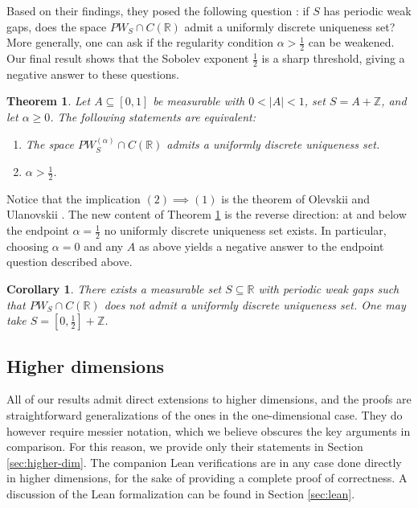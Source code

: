 \documentclass[reqno,a4paper,12pt]{amsart}
\numberwithin{equation}{section}
\newtheorem{theorem}[definition]{Theorem}
\newtheorem{corollary}[definition]{Corollary}
\def\Z{{\mathbb Z}}
\def\R{{\mathbb R}}
\newcommand\1{\mathds{1}}
\begin{document}
Based on their findings, they posed the following question \cite[Section 7.2]{OlevskiiUlanovskii2017}: if $S$ has periodic weak gaps, does the space $PW_S \cap C(\R)$ admit a uniformly discrete uniqueness set? More generally, one can ask if the regularity condition $\alpha > \frac12$ can be weakened. Our final result shows that the Sobolev exponent $\frac12$ is a sharp threshold, giving a negative answer to these questions.

\begin{theorem}\label{thm:sobolev}
Let $A\subseteq[0,1]$ be measurable with $0<|A|<1$,
set $S=A+\Z$, and let $\alpha\geq0$.
The following statements are equivalent:
\begin{enumerate}
    \item The space $PW^{(\alpha)}_S\cap C(\R)$ admits
    a uniformly discrete uniqueness set.
    \item $\alpha>\frac12$.
\end{enumerate}
\end{theorem}

Notice that the implication $(2) \implies (1)$ is the theorem of Olevskii and Ulanovskii \cite[Theorem 3]{OlevskiiUlanovskii2017}. The new content of Theorem \ref{thm:sobolev} is the reverse direction: at and below the endpoint $\alpha = \frac12$ no uniformly discrete uniqueness set exists. In particular, choosing $\alpha = 0$ and any $A$ as above yields a negative answer to the endpoint question described above.

\begin{corollary}\label{cor:OU}
    There exists a measurable set $S \subseteq \R$ with periodic weak gaps such that $PW_S \cap C(\R)$ does not admit a uniformly discrete uniqueness set. One may take $S = [0,\frac12] + \Z$.
\end{corollary}

\subsection{Higher dimensions}\label{sec:highdim}
All of our results admit direct extensions to higher dimensions, and the proofs are straightforward generalizations of the ones in the one-dimensional case. They do however require messier notation, which we believe obscures the key arguments in comparison. For this reason, we provide only their statements in Section \ref{sec:higher-dim}. The companion Lean verifications are in any case done directly in higher dimensions, for the sake of providing a complete proof of correctness. A discussion of the Lean formalization can be found in Section \ref{sec:lean}.
\end{document}
